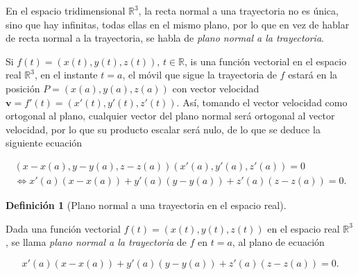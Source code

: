 \documentclass[
  a4paper,
]{scrreport}
\theoremstyle{definition}
\theoremstyle{plain}
\theoremstyle{plain}
\theoremstyle{plain}
\theoremstyle{definition}
\newtheorem{definition}{Definición}[chapter]
\theoremstyle{remark}
\begin{document}
En el espacio tridimensional \(\mathbb{R}^3\), la recta normal a una
trayectoria no es única, sino que hay infinitas, todas ellas en el mismo
plano, por lo que en vez de hablar de recta normal a la trayectoria, se
habla de \emph{plano normal a la trayectoria}.

Si \(f(t)=(x(t),y(t),z(t))\), \(t\in \mathbb{R}\), is una función
vectorial en el espacio real \(\mathbb{R}^3\), en el instante \(t=a\),
el móvil que sigue la trayectoria de \(f\) estará en la posición
\(P=(x(a),y(a),z(a))\) con vector velocidad
\(\mathbf{v}=f'(t)=(x'(t),y'(t),z'(t))\). Así, tomando el vector
velocidad como ortogonal al plano, cualquier vector del plano normal
será ortogonal al vector velocidad, por lo que su producto escalar será
nulo, de lo que se deduce la siguiente ecuación

\[
\begin{gathered}
(x-x(a),y-y(a),z-z(a))(x'(a),y'(a),z'(a)) = 0 \\
\Leftrightarrow x'(a)(x-x(a))+y'(a)(y-y(a))+z'(a)(z-z(a))=0.
\end{gathered}
\]

\begin{definition}[Plano normal a una trayectoria en el espacio
real]\protect\hypertarget{def-plano-normal-trayectoria-espacio}{}\label{def-plano-normal-trayectoria-espacio}

Dada una función vectorial \(f(t)=(x(t),y(t),z(t))\) en el espacio real
\(\mathbb{R}^3\), se llama \emph{plano normal a la trayectoria} de \(f\)
en \(t=a\), al plano de ecuación

\[
x'(a)(x-x(a))+y'(a)(y-y(a))+z'(a)(z-z(a))=0.
\]

\end{definition}
\end{document}
